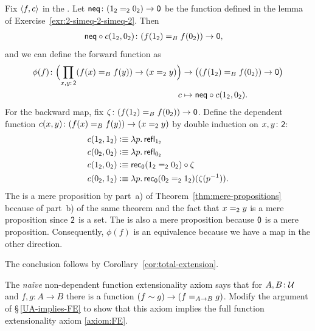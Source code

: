 \begin{solution}
    Fix $\langle f,c\rangle$ in the \lhs. Let $\fun{neq}\colon(1_{\fun2}\eq{\fun2}0_{\fun2})\to\fun0$ be the function defined in the lemma of Exercise~\ref{exr:2-simeq-2-simeq-2}. Then 
    \begin{align*}
        \fun{neq}\circ c(1_{\fun2},0_{\fun2})
            &\colon(f(1_{\fun2})\eq Bf(0_{\fun2}))\to\fun0,
    \end{align*}
    and we can define the forward function as
    \begin{align*}
        \phi(f)\colon
            \Bigl(
                \prod_{x,y\colon\fun2}(f(x)\eq Bf(y))\to(x\eq{\fun2}y)
            \Bigr)
            &\to
            \bigl(
                (f(1_{\fun2})\eq Bf(0_{\fun2}))\to\fun0
            \bigr)\\
        c&\mapsto\fun{neq}\circ c(1_{\fun2},0_{\fun2}).
    \end{align*}
    For the backward map, fix $\zeta\colon(f(1_{\fun2})\eq Bf(0_{\fun2}))\to\fun0$. Define the dependent function $c(x,y)\colon(f(x)\eq Bf(y))\to(x\eq{\fun2}y)$ by double induction on $x,y\colon\fun2$:
    \begin{align*}
        c(1_{\mathsf{2}},1_{\mathsf{2}})&\mathrel{\vcentcolon}\equiv\lambda p.\,\mathsf{refl}_{1_{\mathsf{2}}}\\
        c(0_{\mathsf{2}},0_{\mathsf{2}})&\mathrel{\vcentcolon}\equiv\lambda p.\,\mathsf{refl}_{0_{\mathsf{2}}}\\
        c(1_{\mathsf{2}},0_{\mathsf{2}})&\mathrel{\vcentcolon}\equiv\mathsf{rec}_{\mathsf{0}}(1_{\mathsf{2}}\mathrel{=_{\mathsf{2}}}0_{\mathsf{2}})\circ\zeta\\
        c(0_{\mathsf{2}},1_{\mathsf{2}})&\mathrel{\vcentcolon}\equiv\lambda p.\,\mathsf{rec}_{\mathsf{0}}(0_{\mathsf{2}}\mathrel{=_{\mathsf{2}}}1_{\mathsf{2}})(\zeta(p^{-1})).
    \end{align*}
    The \lhs is a mere proposition by part~a) of Theorem~\ref{thm:mere-propositions} because of part~b) of the same theorem and the fact that $x\mathrel{=_{\mathsf{2}}}y$ is a mere proposition since $\mathsf{2}$ is a set. The \rhs is also a mere proposition because $\mathsf{0}$ is a mere proposition. Consequently, $\phi(f)$ is an equivalence because we have a map in the other direction.
    
    The conclusion follows by Corollary~\ref{cor:total-extension}.
\end{solution}


\begin{exr}
    The \textsl{na\"ive} non-dependent function extensionality axiom says that for\/ $A,B\colon\univ$ and\/ $f,g\colon A\to B$ there is a function\/ $(f\sim g)\to(f\mathrel{=_{A\to B}}g)$. Modify the argument of\/ {\upshape\S\,\ref{UA-implies-FE}} to show that this axiom implies the full function extensionality axiom\/ {\upshape\ref{axiom:FE}}.
\end{exr}

